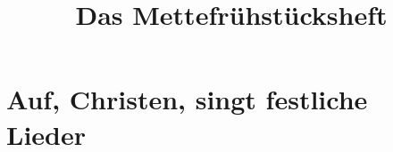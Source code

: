 \documentclass[a5paper, landscape]{article}
\title{Das Mettefrühstücksheft}
\begin{document}
\maketitle

\tableofcontents

\section{Auf, Christen, singt festliche Lieder}
\end{document}
